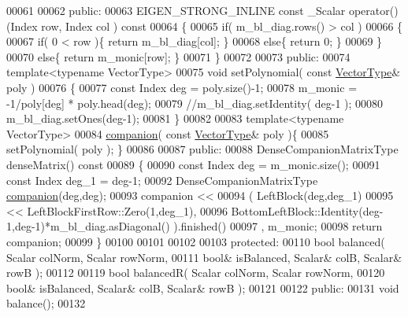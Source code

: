 \begin{DoxyCode}
00061 
00062   \textcolor{keyword}{public}:
00063     EIGEN\_STRONG\_INLINE \textcolor{keyword}{const} \_Scalar operator()(Index row, Index col )\textcolor{keyword}{ const}
00064 \textcolor{keyword}{    }\{
00065       \textcolor{keywordflow}{if}( m\_bl\_diag.rows() > col )
00066       \{
00067         \textcolor{keywordflow}{if}( 0 < row )\{ \textcolor{keywordflow}{return} m\_bl\_diag[col]; \}
00068         \textcolor{keywordflow}{else}\{ \textcolor{keywordflow}{return} 0; \}
00069       \}
00070       \textcolor{keywordflow}{else}\{ \textcolor{keywordflow}{return} m\_monic[row]; \}
00071     \}
00072 
00073   \textcolor{keyword}{public}:
00074     \textcolor{keyword}{template}<\textcolor{keyword}{typename} VectorType>
00075     \textcolor{keywordtype}{void} setPolynomial( \textcolor{keyword}{const} \hyperlink{struct_vector_type}{VectorType}& poly )
00076     \{
00077       \textcolor{keyword}{const} Index deg = poly.size()-1;
00078       m\_monic = -1/poly[deg] * poly.head(deg);
00079       \textcolor{comment}{//m\_bl\_diag.setIdentity( deg-1 );}
00080       m\_bl\_diag.setOnes(deg-1);
00081     \}
00082 
00083     \textcolor{keyword}{template}<\textcolor{keyword}{typename} VectorType>
00084     \hyperlink{class_eigen_1_1internal_1_1companion}{companion}( \textcolor{keyword}{const} \hyperlink{struct_vector_type}{VectorType}& poly )\{
00085       setPolynomial( poly ); \}
00086 
00087   \textcolor{keyword}{public}:
00088     DenseCompanionMatrixType denseMatrix()\textcolor{keyword}{ const}
00089 \textcolor{keyword}{    }\{
00090       \textcolor{keyword}{const} Index deg   = m\_monic.size();
00091       \textcolor{keyword}{const} Index deg\_1 = deg-1;
00092       DenseCompanionMatrixType \hyperlink{class_eigen_1_1internal_1_1companion}{companion}(deg,deg);
00093       companion <<
00094         ( LeftBlock(deg,deg\_1)
00095           << LeftBlockFirstRow::Zero(1,deg\_1),
00096           BottomLeftBlock::Identity(deg-1,deg-1)*m\_bl\_diag.asDiagonal() ).finished()
00097         , m\_monic;
00098       \textcolor{keywordflow}{return} companion;
00099     \}
00100 
00101 
00102 
00103   \textcolor{keyword}{protected}:
00110     \textcolor{keywordtype}{bool} balanced( Scalar colNorm, Scalar rowNorm,
00111         \textcolor{keywordtype}{bool}& isBalanced, Scalar& colB, Scalar& rowB );
00112 
00119     \textcolor{keywordtype}{bool} balancedR( Scalar colNorm, Scalar rowNorm,
00120         \textcolor{keywordtype}{bool}& isBalanced, Scalar& colB, Scalar& rowB );
00121 
00122   \textcolor{keyword}{public}:
00131     \textcolor{keywordtype}{void} balance();
00132 

\end{DoxyCode}
